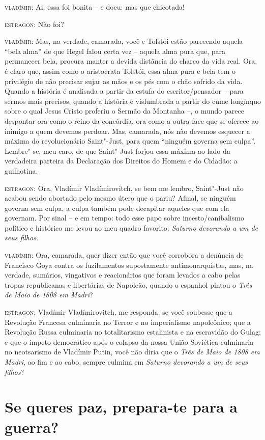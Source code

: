\textsc{vladímir:} Ai, essa foi bonita -- e doeu: mas que chicotada!

\textsc{estragon:} Não foi?

\textsc{vladímir:} Mas, na verdade, camarada, você e Tolstói estão
parecendo aquela ``bela alma'' de que Hegel falou certa vez -- aquela
alma pura que, para permanecer bela, procura manter a devida distância
do charco da vida real. Ora, é claro que, assim como o aristocrata
Tolstói, essa alma pura e bela tem o privilégio de não precisar sujar as
mãos e os pés com o chão sofrido da vida. Quando a história é analisada
a partir da estufa do escritor/pensador -- para sermos mais precisos,
quando a história é vislumbrada a partir do cume longínquo sobre o qual
Jesus Cristo proferiu o Sermão da Montanha --, o mundo parece despontar
ora como o reino da concórdia, ora como a outra face que se oferece ao
inimigo a quem devemos perdoar. Mas, camarada, nós não devemos esquecer
a máxima do revolucionário Saint"-Just, para quem ``ninguém governa sem
culpa''. Lembre"-se, meu caro, de que Saint"-Just forjou essa máxima ao
lado da verdadeira parteira da Declaração dos Direitos do Homem e do
Cidadão: a guilhotina.

\textsc{estragon:} Ora, Vladímir Vladímirovitch, se bem me lembro,
Saint"-Just não acabou sendo abortado pelo mesmo útero que o pariu?
Afinal, se ninguém governa sem culpa, a culpa também pode decapitar
aqueles que com ela governam. Por sinal -- e em tempo: todo esse papo
sobre incesto/canibalismo político e histórico me levou ao meu quadro
favorito: \emph{Saturno devorando a um de seus filhos.}

\textsc{vladímir:} Ora, camarada, quer dizer então que você corrobora a
denúncia de Francisco Goya contra os fuzilamentos supostamente
antimonarquistas, mas, na verdade, sumários, vingativos e reacionários
que foram levados a cabo pelas tropas republicanas e libertárias de
Napoleão, quando o espanhol pintou o \emph{Três de Maio de 1808 em
Madri}?

\textsc{estragon:} Vladímir Vladímirovitch, me responda: se você
soubesse que a Revolução Francesa culminaria no Terror e no imperialismo
napoleônico; que a Revolução Russa culminaria no totalitarismo
estalinista e na escravidão do Gulag; e que o ímpeto democrático após o
colapso da nossa União Soviética culminaria no neotsarismo de Vladímir
Putin, você não diria que o \emph{Três de Maio de 1808 em Madri}, ao fim
e ao cabo, sempre culmina em \emph{Saturno devorando a um de seus
filhos}?

\chapter*{Se queres paz, prepara-te para a guerra?}

